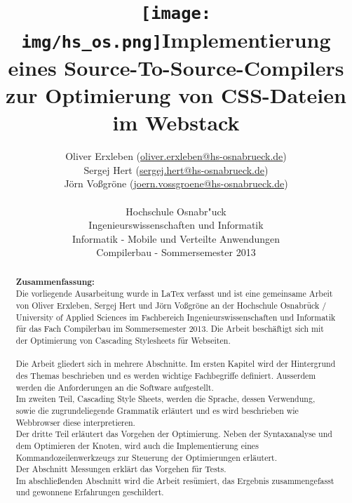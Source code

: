 \documentclass[11pt]{scrartcl}
\begin{document}
\author{%
	Oliver Erxleben \small(\href{mailto:oliver.erxleben@hs-osnabrueck.de}{oliver.erxleben@hs-osnabrueck.de})\\%
	Sergej Hert \small(\href{mailto:sergej.hert@hs-osnabrueck.de}{sergej.hert@hs-osnabrueck.de})\\%
	Jörn Voßgröne \small(\href{mailto:joern.vossgroene@hs-osnabrueck.de}{joern.vossgroene@hs-osnabrueck.de})\\
	\\%
	Hochschule Osnabr"uck \\%
	Ingenieurswissenschaften und Informatik \\%
	Informatik - Mobile und Verteilte Anwendungen\\
	Compilerbau - Sommersemester 2013 }

\title{\texttt{[image: img/hs\_os.png]}\linebreak \linebreak Implementierung eines Source-To-Source-Compilers zur Optimierung von CSS-Dateien im Webstack}

\maketitle
\thispagestyle{empty}
\pagebreak
\tableofcontents
\listoffigures

\lstlistoflistings
\thispagestyle{empty}
\pagebreak
\thispagestyle{empty}

\begin{abstract}

\textbf{Zusammenfassung:}\\ 	
Die vorliegende Ausarbeitung wurde in LaTex verfasst und ist eine gemeinsame Arbeit von Oliver Erxleben, Sergej Hert und Jörn Voßgröne an der Hochschule Osnabrück / University of Applied Sciences im Fachbereich Ingenieurswissenschaften und Informatik für das Fach Compilerbau im Sommersemester 2013. Die Arbeit beschäftigt sich mit der Optimierung von Cascading Stylesheets für Webseiten.\\
\\
Die Arbeit gliedert sich in mehrere Abschnitte. Im ersten Kapitel wird der Hintergrund des Themas beschrieben und es werden wichtige Fachbegriffe definiert. Ausserdem werden die Anforderungen an die Software aufgestellt.\\
Im zweiten Teil, Cascading Style Sheets, werden die Sprache, dessen Verwendung, sowie die zugrundeliegende Grammatik erläutert und es wird beschrieben wie Webbrowser diese interpretieren.\\
Der dritte Teil erläutert das Vorgehen der Optimierung. Neben der Syntaxanalyse und dem Optimieren der Knoten, wird auch die Implementierung eines Kommandozeilenwerkzeugs zur Steuerung der Optimierungen erläutert.\\
Der Abschnitt Messungen erklärt das Vorgehen für Tests. \\ Im abschließenden Abschnitt wird die Arbeit resümiert, das Ergebnis zusammengefasst und gewonnene Erfahrungen geschildert.   
\end{abstract}
\end{document}
